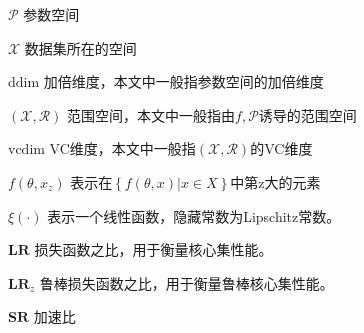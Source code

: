 
\begin{notation}

  \begin{notationlist}{2em}
    \item[$\displaystyle \mathcal{P}$] 参数空间
    \item[$\displaystyle \mathcal{X}$] 数据集所在的空间 
    \item[$\displaystyle \text{ddim}$] 加倍维度，本文中一般指参数空间的加倍维度
    \item[$\displaystyle (\mathcal{X},\mathcal{R})$] 范围空间，本文中一般指由$f,\mathcal{P}$诱导的范围空间
    \item[$\displaystyle \text{vcdim}$] VC维度，本文中一般指$(\mathcal{X},\mathcal{R})$的VC维度
    \item[$\displaystyle f(\theta,x_z)$] 表示在$\left\{f(\theta,x)|x\in X\right\}$中第z大的元素
    \item[$\displaystyle \xi(\cdot)$] 表示一个线性函数，隐藏常数为Lipschitz常数。
    \item[$\displaystyle \mathbf{LR}$] 损失函数之比，用于衡量核心集性能。
    \item[$\displaystyle \mathbf{LR}_z$] 鲁棒损失函数之比，用于衡量鲁棒核心集性能。
    \item[$\displaystyle \mathbf{SR}$] 加速比 
  \end{notationlist}

\end{notation}





